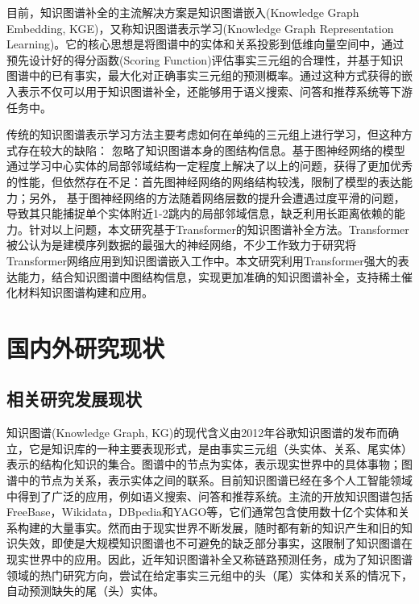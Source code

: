 目前，知识图谱补全的主流解决方案是知识图谱嵌入(Knowledge Graph Embedding, KGE)，又称知识图谱表示学习(Knowledge Graph Representation Learning)。它的核心思想是将图谱中的实体和关系投影到低维向量空间中，通过预先设计好的得分函数(Scoring Function)评估事实三元组的合理性，并基于知识图谱中的已有事实，最大化对正确事实三元组的预测概率。通过这种方式获得的嵌入表示不仅可以用于知识图谱补全，还能够用于语义搜索、问答和推荐系统等下游任务中。

传统的知识图谱表示学习方法主要考虑如何在单纯的三元组上进行学习，但这种方式存在较大的缺陷：
忽略了知识图谱本身的图结构信息。基于图神经网络的模型通过学习中心实体的局部邻域结构一定程度上解决了以上的问题，获得了更加优秀的性能，但依然存在不足：首先图神经网络的网络结构较浅，限制了模型的表达能力；另外，
基于图神经网络的方法随着网络层数的提升会遭遇过度平滑的问题，导致其只能捕捉单个实体附近1-2跳内的局部邻域信息，缺乏利用长距离依赖的能力。针对以上问题，本文研究基于Transformer的知识图谱补全方法。Transformer被公认为是建模序列数据的最强大的神经网络，不少工作致力于研究将Transformer网络应用到知识图谱嵌入工作中。本文研究利用Transformer强大的表达能力，结合知识图谱中图结构信息，实现更加准确的知识图谱补全，支持稀土催化材料知识图谱构建和应用。


\section{国内外研究现状}

\subsection{相关研究发展现状}
知识图谱(Knowledge Graph, KG)的现代含义由2012年谷歌知识图谱的发布而确立，它是知识库的一种主要表现形式，是由事实三元组（头实体、关系、尾实体）表示的结构化知识的集合。图谱中的节点为实体，表示现实世界中的具体事物；图谱中的节点为关系，表示实体之间的联系。目前知识图谱已经在多个人工智能领域中得到了广泛的应用，例如语义搜索、问答和推荐系统。主流的开放知识图谱包括FreeBase，Wikidata，DBpedia和YAGO等，它们通常包含使用数十亿个实体和关系构建的大量事实。然而由于现实世界不断发展，随时都有新的知识产生和旧的知识失效，即使是大规模知识图谱也不可避免的缺乏部分事实，这限制了知识图谱在现实世界中的应用。因此，近年知识图谱补全又称链路预测任务，成为了知识图谱领域的热门研究方向，尝试在给定事实三元组中的头（尾）实体和关系的情况下，自动预测缺失的尾（头）实体。

